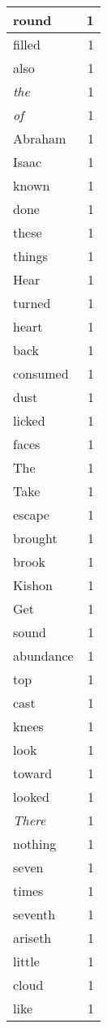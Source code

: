 \begin{center}
\begin{longtable}{l|r}
round & 1\\ \hline 
filled & 1\\ \hline 
also & 1\\ \hline 
\emph{the} & 1\\ \hline 
\emph{of} & 1\\ \hline 
Abraham & 1\\ \hline 
Isaac & 1\\ \hline 
known & 1\\ \hline 
done & 1\\ \hline 
these & 1\\ \hline 
things & 1\\ \hline 
Hear & 1\\ \hline 
turned & 1\\ \hline 
heart & 1\\ \hline 
back & 1\\ \hline 
consumed & 1\\ \hline 
dust & 1\\ \hline 
licked & 1\\ \hline 
faces & 1\\ \hline 
The & 1\\ \hline 
Take & 1\\ \hline 
escape & 1\\ \hline 
brought & 1\\ \hline 
brook & 1\\ \hline 
Kishon & 1\\ \hline 
Get & 1\\ \hline 
sound & 1\\ \hline 
abundance & 1\\ \hline 
top & 1\\ \hline 
cast & 1\\ \hline 
knees & 1\\ \hline 
look & 1\\ \hline 
toward & 1\\ \hline 
looked & 1\\ \hline 
\emph{There} & 1\\ \hline 
nothing & 1\\ \hline 
seven & 1\\ \hline 
times & 1\\ \hline 
seventh & 1\\ \hline 
ariseth & 1\\ \hline 
little & 1\\ \hline 
cloud & 1\\ \hline 
like & 1\\ \hline 

\end{longtable}
\end{center}

